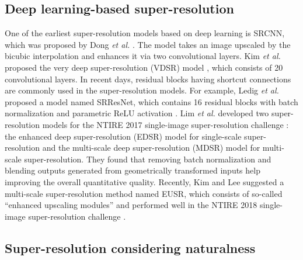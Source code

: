 \documentclass[runningheads]{llncs}
\begin{document}
\subsection{Deep learning-based super-resolution}

One of the earliest super-resolution models based on deep learning is SRCNN, which was proposed by Dong \textit{et al.} \cite{dong2014learning}.
The model takes an image upscaled by the bicubic interpolation and enhances it via two convolutional layers.
Kim \textit{et al.} proposed the very deep super-resolution (VDSR) model \cite{kim2016accurate}, which consists of 20 convolutional layers.
In recent days, residual blocks having shortcut connections \cite{he2016deep} are commonly used in the super-resolution models.
For example, Ledig \textit{et al.} \cite{ledig2017photo} proposed a model named SRResNet, which contains 16 residual blocks with batch normalization \cite{ioffe2015batch} and parametric ReLU activation \cite{he2015delving}.
Lim \textit{et al.} \cite{lim2017enhanced} developed two super-resolution models for the NTIRE 2017 single-image super-resolution challenge \cite{timofte2017ntire}: the enhanced deep super-resolution (EDSR) model for single-scale super-resolution and the multi-scale deep super-resolution (MDSR) model for multi-scale super-resolution.
They found that removing batch normalization and blending outputs generated from geometrically transformed inputs help improving the overall quantitative quality.
Recently, Kim and Lee \cite{kim2018deep} suggested a multi-scale super-resolution method named EUSR, which consists of so-called ``enhanced upscaling modules'' and performed well in the NTIRE 2018 single-image super-resolution challenge \cite{timofte2018ntire}.

\subsection{Super-resolution considering naturalness}
\end{document}
